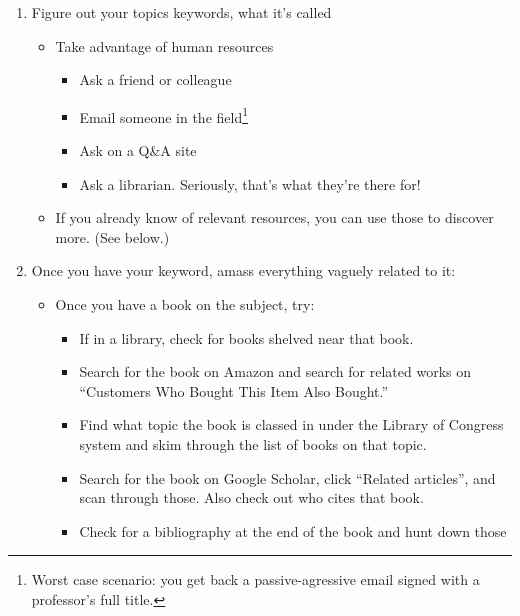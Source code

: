 \begin{enumerate}
\item Figure out your topics keywords, what it's called
  \begin{itemize}
  \item Take advantage of human resources
    \begin{itemize}
    \item Ask a friend or colleague
    \item Email someone in the field\footnote{Worst case scenario: you get back a
      passive-agressive email signed with a professor's full title.}
    \item Ask on a Q\&A site
    \item Ask a librarian. Seriously, that's what they're there for!
    \end{itemize}
  \item If you already know of relevant resources, you can use those to discover
    more. (See below.)
  \end{itemize}
\item Once you have your keyword, amass everything vaguely related to it:
  \begin{itemize}
    \begin{itemize}
    \item Search for a textbook on the topic.
    \item Search for a review article on the textbook.
    \item Search for an annotated bibliography.
    \item Check the references on Wikipedia for your subject.
    \end{itemize}
  \item Once you have a book on the subject, try:
    \begin{itemize}
    \item If in a library, check for books shelved near that book.
    \item Search for the book on Amazon and search for related works on
      ``Customers Who Bought This Item Also Bought.''
    \item Find what topic the book is classed in under the Library of Congress
      system and skim through the list of books on that topic.
    \item Search for the book on Google Scholar, click ``Related articles'', and
      scan through those. Also check out who cites that book.
    \item Check for a bibliography at the end of the book and hunt down those

\end{itemize}
\end{itemize}
\end{enumerate}
